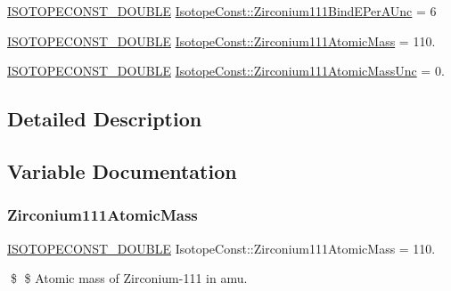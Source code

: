 \begin{DoxyCompactItemize}
\mbox{\hyperlink{group___isotope_const-_macros_ga8f45a7272ce02c0b4c65c44636ed719a}{I\+S\+O\+T\+O\+P\+E\+C\+O\+N\+S\+T\+\_\+\+D\+O\+U\+B\+LE}} \mbox{\hyperlink{group___isotope_const-_zirconium-_zr111_ga9eea8a8ca59466338adb12a5a8f0078d}{Isotope\+Const\+::\+Zirconium111\+Bind\+E\+Per\+A\+Unc}} = 6
\item 
\mbox{\hyperlink{group___isotope_const-_macros_ga8f45a7272ce02c0b4c65c44636ed719a}{I\+S\+O\+T\+O\+P\+E\+C\+O\+N\+S\+T\+\_\+\+D\+O\+U\+B\+LE}} \mbox{\hyperlink{group___isotope_const-_zirconium-_zr111_gab4cb932c7fc391784e0a5fe95381f73b}{Isotope\+Const\+::\+Zirconium111\+Atomic\+Mass}} = 110.
\item 
\mbox{\hyperlink{group___isotope_const-_macros_ga8f45a7272ce02c0b4c65c44636ed719a}{I\+S\+O\+T\+O\+P\+E\+C\+O\+N\+S\+T\+\_\+\+D\+O\+U\+B\+LE}} \mbox{\hyperlink{group___isotope_const-_zirconium-_zr111_ga69257384b8a46c15a7900460ea5f41b2}{Isotope\+Const\+::\+Zirconium111\+Atomic\+Mass\+Unc}} = 0.
\end{DoxyCompactItemize}


\subsection{Detailed Description}


\subsection{Variable Documentation}
\mbox{\label{group___isotope_const-_zirconium-_zr111_gab4cb932c7fc391784e0a5fe95381f73b}} 
\subsubsection{\texorpdfstring{Zirconium111\+Atomic\+Mass}{Zirconium111AtomicMass}}
{\footnotesize\ttfamily \mbox{\hyperlink{group___isotope_const-_macros_ga8f45a7272ce02c0b4c65c44636ed719a}{I\+S\+O\+T\+O\+P\+E\+C\+O\+N\+S\+T\+\_\+\+D\+O\+U\+B\+LE}} Isotope\+Const\+::\+Zirconium111\+Atomic\+Mass = 110.}

\$ \$ Atomic mass of Zirconium-\/111 in amu. \mbox{\label{group___isotope_const-_zirconium-_zr111_ga69257384b8a46c15a7900460ea5f41b2}} 
